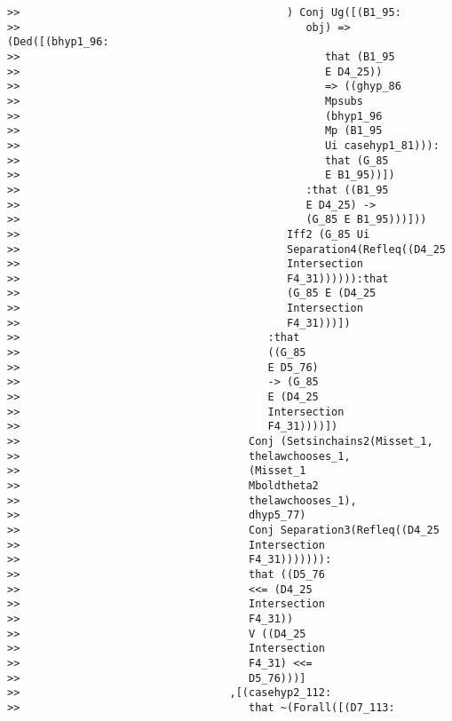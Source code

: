 \documentclass[12pt]{article}
\begin{document}
\begin{verbatim}
>>                                          ) Conj Ug([(B1_95:
>>                                             obj) => (Ded([(bhyp1_96:
>>                                                that (B1_95
>>                                                E D4_25))
>>                                                => ((ghyp_86
>>                                                Mpsubs
>>                                                (bhyp1_96
>>                                                Mp (B1_95
>>                                                Ui casehyp1_81))):
>>                                                that (G_85
>>                                                E B1_95))])
>>                                             :that ((B1_95
>>                                             E D4_25) ->
>>                                             (G_85 E B1_95)))]))
>>                                          Iff2 (G_85 Ui
>>                                          Separation4(Refleq((D4_25
>>                                          Intersection
>>                                          F4_31)))))):that
>>                                          (G_85 E (D4_25
>>                                          Intersection
>>                                          F4_31)))])
>>                                       :that
>>                                       ((G_85
>>                                       E D5_76)
>>                                       -> (G_85
>>                                       E (D4_25
>>                                       Intersection
>>                                       F4_31))))])
>>                                    Conj (Setsinchains2(Misset_1,
>>                                    thelawchooses_1,
>>                                    (Misset_1
>>                                    Mboldtheta2
>>                                    thelawchooses_1),
>>                                    dhyp5_77)
>>                                    Conj Separation3(Refleq((D4_25
>>                                    Intersection
>>                                    F4_31))))))):
>>                                    that ((D5_76
>>                                    <<= (D4_25
>>                                    Intersection
>>                                    F4_31))
>>                                    V ((D4_25
>>                                    Intersection
>>                                    F4_31) <<=
>>                                    D5_76)))]
>>                                 ,[(casehyp2_112:
>>                                    that ~(Forall([(D7_113:

\end{verbatim}
\end{document}
